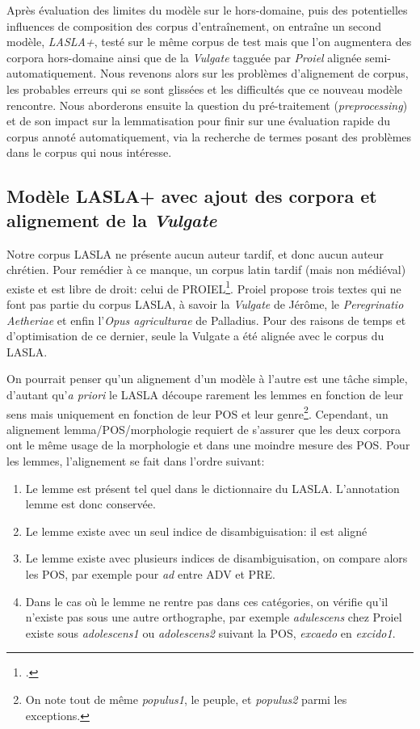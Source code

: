 Après évaluation des limites du modèle sur le hors-domaine, puis des potentielles influences de composition des corpus d'entraînement, on entraîne un second modèle, \textit{LASLA+}, testé sur le même corpus de test mais que l'on augmentera des corpora hors-domaine ainsi que de la \textit{Vulgate} tagguée par \textit{Proiel} alignée semi-automatiquement. Nous revenons alors sur les problèmes d'alignement de corpus, les probables erreurs qui se sont glissées et les difficultés que ce nouveau modèle rencontre. Nous aborderons ensuite la question du pré-traitement (\textit{preprocessing}) et de son impact sur la lemmatisation pour finir sur une évaluation rapide du corpus annoté automatiquement, via la recherche de termes posant des problèmes dans le corpus qui nous intéresse.

\subsection{Modèle LASLA+ avec ajout des corpora et alignement de la \textit{Vulgate}}

Notre corpus LASLA ne présente aucun auteur tardif, et donc aucun auteur chrétien. Pour remédier à ce manque, un corpus latin tardif (mais non médiéval) existe et est libre de droit: celui de PROIEL\footcite{haug_creating_2008}. Proiel propose trois textes qui ne font pas partie du corpus LASLA, à savoir la \textit{Vulgate} de Jérôme, le \textit{Peregrinatio Aetheriae} et enfin l'\textit{Opus agriculturae} de Palladius. Pour des raisons de temps et d'optimisation de ce dernier, seule la Vulgate a été alignée avec le corpus du LASLA.

On pourrait penser qu'un alignement d'un modèle à l'autre est une tâche simple, d'autant qu'\textit{a priori} le LASLA découpe rarement les lemmes en fonction de leur sens mais uniquement en fonction de leur POS et leur genre\footnote{On note tout de même \textit{populus1}, le peuple, et \textit{populus2} parmi les exceptions.}. Cependant, un alignement lemma/POS/morphologie requiert de s'assurer que les deux corpora ont le même usage de la morphologie et dans une moindre mesure des POS. Pour les lemmes, l'alignement se fait dans l'ordre suivant:
\begin{enumerate}
    \item Le lemme est présent tel quel dans le dictionnaire du LASLA. L'annotation lemme est donc conservée.
    \item Le lemme existe avec un seul indice de disambiguisation: il est aligné
    \item Le lemme existe avec plusieurs indices de disambiguisation, on compare alors les POS, par exemple pour \textit{ad} entre ADV et PRE.
    \item Dans le cas où le lemme ne rentre pas dans ces catégories, on vérifie qu'il n'existe pas sous une autre orthographe, par exemple \textit{adulescens} chez Proiel existe sous \textit{adolescens1} ou \textit{adolescens2} suivant la POS, \textit{excaedo} en \textit{excido1}.
\end{enumerate}

